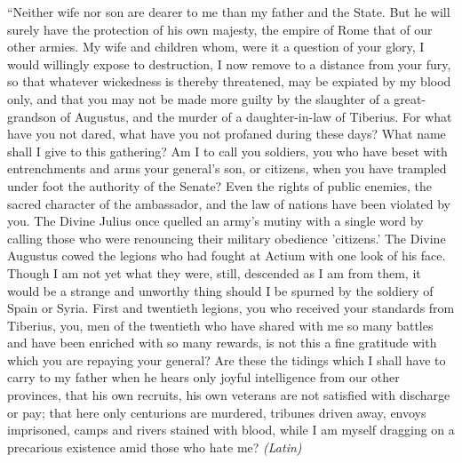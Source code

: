 ``Neither wife nor son are dearer to me than my father and the State. But he will surely have the protection of his own majesty, the empire of Rome that of our other armies. My wife and children whom, were it a question of your glory, I would willingly expose to destruction, I now remove to a distance from your fury, so that whatever wickedness is thereby threatened, may be expiated by my blood only, and that you may not be made more guilty by the slaughter of a great-grandson of Augustus, and the murder of a daughter-in-law of Tiberius. For what have you not dared, what have you not profaned during these days? What name shall I give to this gathering? Am I to call you soldiers, you who have beset with entrenchments and arms your general's son, or citizens, when you have trampled under foot the authority of the Senate? Even the rights of public enemies, the sacred character of the ambassador, and the law of nations have been violated by you. The Divine Julius once quelled an army's mutiny with a single word by calling those who were renouncing their military obedience 'citizens.' The Divine Augustus cowed the legions who had fought at Actium with one look of his face. Though I am not yet what they were, still, descended as I am from them, it would be a strange and unworthy thing should I be spurned by the soldiery of Spain or Syria. First and twentieth legions, you who received your standards from Tiberius, you, men of the twentieth who have shared with me so many battles and have been enriched with so many rewards, is not this a fine gratitude with which you are repaying your general? Are these the tidings which I shall have to carry to my father when he hears only joyful intelligence from our other provinces, that his own recruits, his own veterans are not satisfied with discharge or pay; that here only centurions are murdered, tribunes driven away, envoys imprisoned, camps and rivers stained with blood, while I am myself dragging on a precarious existence amid those who hate me? \emph{(Latin)}


